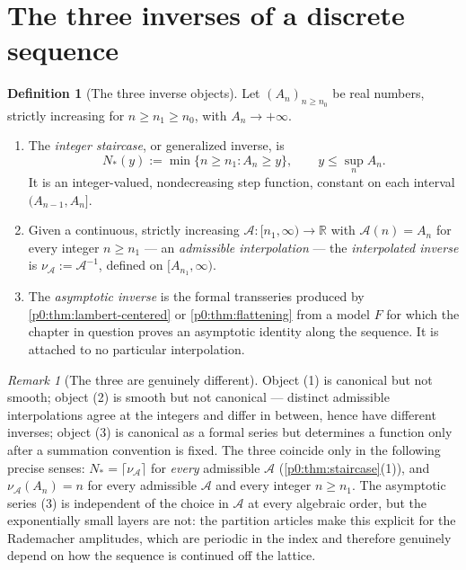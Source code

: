 \documentclass[11pt,a4paper,oneside]{book}
\theoremstyle{plain}
\theoremstyle{definition}
\newtheorem{definition}[theorem]{Definition}
\theoremstyle{remark}
\newtheorem{remark}[theorem]{Remark}
\newcommand{\Real}{\mathbb{R}}
\begin{document}
\section{The three inverses of a discrete sequence}\label{p0:sec:discrete}

\begin{definition}[The three inverse objects]\label{p0:def:three-inverses}
Let $(A_n)_{n\ge n_0}$ be real numbers, strictly increasing for $n\ge n_1\ge n_0$,
with $A_n\to+\infty$.
\begin{enumerate}
\item The \emph{integer staircase}, or generalized inverse, is
      \begin{equation}\label{p0:eq:staircase-def}
       N_\ast(y):=\min\{n\ge n_1:A_n\ge y\},\qquad y\le\sup_nA_n .
      \end{equation}
      It is an integer-valued, nondecreasing step function, constant on each
      interval $(A_{n-1},A_n]$.
\item Given a continuous, strictly increasing
      $\mathcal A:[n_1,\infty)\to\Real$ with $\mathcal A(n)=A_n$ for every
      integer $n\ge n_1$ --- an \emph{admissible interpolation} --- the
      \emph{interpolated inverse} is $\nu_{\mathcal A}:=\mathcal A^{-1}$,
      defined on $[A_{n_1},\infty)$.
\item The \emph{asymptotic inverse} is the formal transseries produced by
      \cref{p0:thm:lambert-centered} or \cref{p0:thm:flattening} from a model
      $F$ for which the chapter in question proves an asymptotic identity
      along the sequence.  It is attached to no particular interpolation.
\end{enumerate}
\end{definition}

\begin{remark}[The three are genuinely different]\label{p0:rem:three-differ}
Object (1) is canonical but not smooth; object (2) is smooth but not canonical
--- distinct admissible interpolations agree at the integers and differ in
between, hence have different inverses; object (3) is canonical as a formal
series but determines a function only after a summation convention is fixed.
The three coincide only in the following precise senses:
$N_\ast=\lceil\nu_{\mathcal A}\rceil$ for \emph{every} admissible
$\mathcal A$ (\cref{p0:thm:staircase}(1)), and
$\nu_{\mathcal A}(A_n)=n$ for every admissible $\mathcal A$ and every integer
$n\ge n_1$.  The asymptotic series (3) is independent of the choice in
$\mathcal A$ at every algebraic order, but the exponentially small layers are
not: the partition articles make this explicit for the Rademacher amplitudes,
which are periodic in the index and therefore genuinely depend on how the
sequence is continued off the lattice.
\end{remark}
\end{document}
